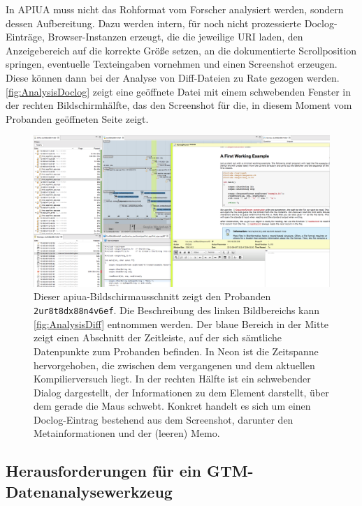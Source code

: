 In APIUA muss nicht das Rohformat vom Forscher analysiert werden, sondern dessen Aufbereitung. Dazu werden intern, für noch nicht prozessierte Doclog-Einträge, Browser-Instanzen erzeugt, die die jeweilige URI laden, den Anzeigebereich auf die korrekte Größe setzen, an die dokumentierte Scrollposition springen, eventuelle Texteingaben vornehmen und einen Screenshot erzeugen. Diese können dann bei der Analyse von Diff-Dateien zu Rate gezogen werden. \autoref{fig:AnalysisDoclog} zeigt eine geöffnete Datei mit einem schwebenden Fenster in der rechten Bildschirmhälfte, das den Screenshot für die, in diesem Moment vom Probanden geöffneten Seite zeigt.

\begin{figure}
  \centering
    \includegraphics[width=1.0\linewidth]{Figures/AnalysisDoclog.png}
  \caption[Beispielhafte Doclog-Datei]{Dieser \gls{apiua}-Bildschirmausschnitt zeigt den Probanden \texttt{2ur8t8dx88n4v6ef}. Die Beschreibung des linken Bildbereichs kann \autoref{fig:AnalysisDiff} entnommen werden. Der blaue Bereich in der Mitte zeigt einen Abschnitt der Zeitleiste, auf der sich sämtliche Datenpunkte zum Probanden befinden. In Neon ist die Zeitspanne hervorgehoben, die zwischen dem vergangenen und dem aktuellen Kompilierversuch liegt. In der rechten Hälfte ist ein schwebender Dialog dargestellt, der Informationen zu dem Element darstellt, über dem gerade die Maus schwebt. Konkret handelt es sich um einen Doclog-Eintrag bestehend aus dem Screenshot, darunter den Metainformationen und der (leeren) Memo.}
  \label{fig:AnalysisDoclog}
\end{figure}



\subsection{Herausforderungen für ein GTM-Datenanalysewerkzeug}

